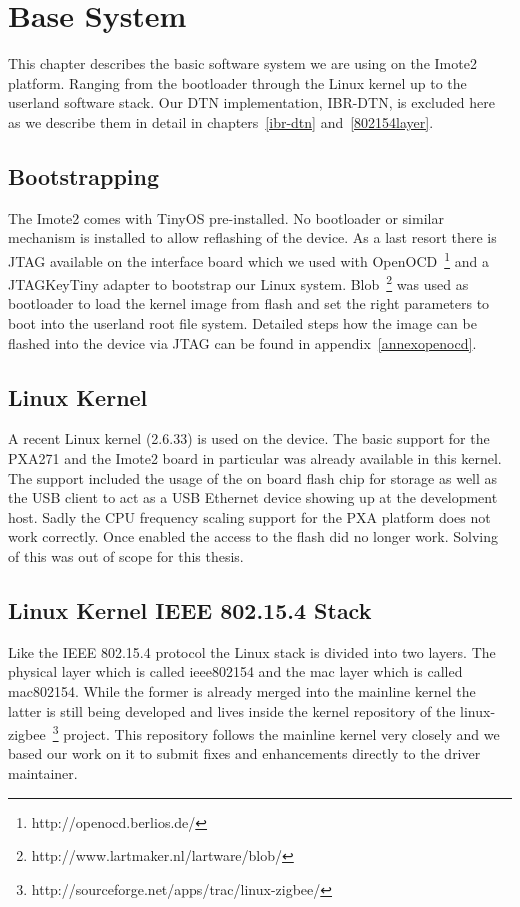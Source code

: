 \chapter{Base System}
This chapter describes the basic software system we are using on the Imote2
platform. Ranging from the bootloader through the Linux kernel up to the
userland software stack. Our DTN implementation, IBR-DTN, is excluded here as we
describe them in detail in chapters~\ref{ibr-dtn} and~\ref{802154layer}.

\section{Bootstrapping}
The Imote2 comes with TinyOS pre-installed. No bootloader or similar mechanism
is installed to allow reflashing of the device. As a last resort there is JTAG
available on the interface board which we used  with OpenOCD~\footnote{http://openocd.berlios.de/} and a
JTAGKeyTiny adapter to bootstrap our Linux system. Blob~\footnote{http://www.lartmaker.nl/lartware/blob/} was used as bootloader to
load the kernel image from flash and set the right parameters to boot into the
userland root file system. Detailed steps how the image can be flashed into the
device via JTAG can be found in appendix~\ref{annexopenocd}.

\section{Linux Kernel}
A recent Linux kernel (2.6.33) is used on the device. The basic support for the
PXA271 and the Imote2 board in particular was already available in this kernel.
The support included the usage of the on board flash chip for storage as well as
the USB client to act as a USB Ethernet device showing up at the development host.
Sadly the CPU frequency scaling support for the PXA platform does not work
correctly. Once enabled the access to the flash did no longer work.
Solving of this was out of scope for this thesis.

\section{Linux Kernel IEEE 802.15.4 Stack}
Like the IEEE 802.15.4 protocol the Linux stack is divided into two layers. The
physical layer which is called ieee802154 and the mac layer which is called
mac802154. While the former is already merged into the mainline kernel the latter
is still being developed and lives inside the kernel repository of the
linux-zigbee~\footnote{http://sourceforge.net/apps/trac/linux-zigbee/} project.
This repository follows the mainline kernel very closely and we based our work
on it to submit fixes and enhancements directly to the driver maintainer.

